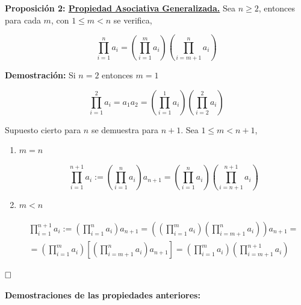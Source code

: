 \documentclass{article}
\begin{document}
\textbf{Proposición 2: \underline{Propiedad Asociativa Generalizada.}} Sea $n\geq 2$, entonces para cada $m$, con $1\leq m < n$ se verifica,

\begin{equation*}
\prod_{i=1}^n a_i=(\prod_{i=1}^m a_i)(\prod_{i=m+1}^n a_i)
\end{equation*}

\textbf{Demostración:} Si $n=2$ entonces $m=1$

\begin{equation*}
\prod_{i=1}^2 a_i=a_1a_2 = (\prod_{i=1}^1 a_i)(\prod_{i=2}^2 a_i)
\end{equation*}

Supuesto cierto para $n$ se demuestra para $n+1$. Sea $1\leq m < n+1$,

\begin{enumerate}[\bfseries C{a}so 1:]
\item $m=n$

\begin{equation*}
\prod_{i=1}^{n+1}a_i := (\prod_{i=1}^n a_i)a_{n+1}=(\prod_{i=1}^n a_i)(\prod_{i=n+1}^{n+1} a_i)
\end{equation*}

\item $m<n$

\begin{equation*}
\begin{split}
\prod_{i=1}^{n+1}a_i := (\prod_{i=1}^n a_i)a_{n+1} = ((\prod_{i=1}^m a_i)(\prod_{i=m+1}^n a_i))a_{n+1}= \\
=(\prod_{i=1}^m a_i)[(\prod_{i=m+1}^n a_i) a_{n+1}] = (\prod_{i=1}^m a_i)(\prod_{i=m+1}^{n+1} a_i)
\end{split}
\end{equation*}

\end{enumerate}

$\hfill\square$

\textbf{Demostraciones de las propiedades anteriores:}
\end{document}
